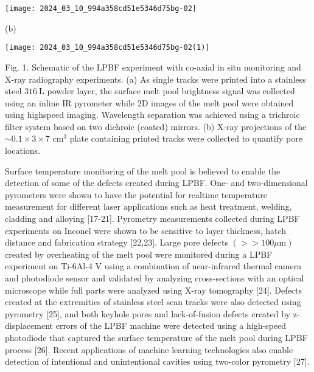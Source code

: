 \documentclass[10pt]{article}
\begin{document}
\begin{center}
\texttt{[image: 2024\_03\_10\_994a358cd51e5346d75bg-02]}
\end{center}

(b)

\begin{center}
\texttt{[image: 2024\_03\_10\_994a358cd51e5346d75bg-02(1)]}
\end{center}

Fig. 1. Schematic of the LPBF experiment with co-axial in situ monitoring and X-ray radiography experiments. (a) As single tracks were printed into a stainless steel $316 \mathrm{~L}$ powder layer, the surface melt pool brightness signal was collected using an inline IR pyrometer while 2D images of the melt pool were obtained using highspeed imaging. Wavelength separation was achieved using a trichroic filter system based on two dichroic (coated) mirrors. (b) X-ray projections of the $\sim 0.1 \times 3 \times 7$ $\mathrm{cm}^{3}$ plate containing printed tracks were collected to quantify pore locations.

Surface temperature monitoring of the melt pool is believed to enable the detection of some of the defects created during LPBF. One- and two-dimensional pyrometers were shown to have the potential for realtime temperature measurement for different laser applications such as heat treatment, welding, cladding and alloying [17-21]. Pyrometry measurements collected during LPBF experiments on Inconel were shown to be sensitive to layer thickness, hatch distance and fabrication strategy [22,23]. Large pore defects $(>>100 \mu \mathrm{m})$ created by overheating of the melt pool were monitored during a LPBF experiment on Ti-6Al-4 V using a combination of near-infrared thermal camera and photodiode sensor and validated by analyzing cross-sections with an optical microscope while full parts were analyzed using X-ray tomography [24]. Defects created at the extremities of stainless steel scan tracks were also detected using pyrometry [25], and both keyhole pores and lack-of-fusion defects created by z-displacement errors of the LPBF machine were detected using a high-speed photodiode that captured the surface temperature of the melt pool during LPBF process [26]. Recent applications of machine learning technologies also enable detection of intentional and unintentional cavities using two-color pyrometry [27].
\end{document}
